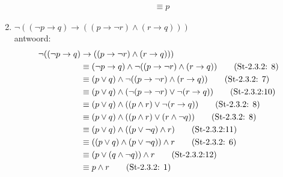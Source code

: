 \begin{answer}
\begin{enumerate}[label=\textit{\alph*.}]
\begin{align}
&\equiv p \tag{St-2.3.2: 1}
\end{align}
\item $\neg((\neg p\rightarrow q)\rightarrow ((p\rightarrow\neg r)\wedge(r\rightarrow q)))$\\
antwoord:
\begin{align}
\neg((\neg p\rightarrow q)&\rightarrow ((p\rightarrow\neg r)\wedge(r\rightarrow q)))\notag\\
&\equiv (\neg p\rightarrow q)\wedge\neg ((p\rightarrow\neg r)\wedge(r\rightarrow q))\tag{St-2.3.2: 8}\\
&\equiv (p\vee q)\wedge\neg((p\rightarrow\neg r)\wedge(r\rightarrow q))\tag{St-2.3.2: 7}\\
&\equiv (p\vee q)\wedge(\neg(p\rightarrow\neg r)\vee\neg(r\rightarrow q))\tag{St-2.3.2:10}\\
&\equiv (p\vee q)\wedge((p\wedge r)\vee\neg(r\rightarrow q))\tag{St-2.3.2: 8}\\
&\equiv (p\vee q)\wedge((p\wedge r)\vee(r\wedge\neg q))\tag{St-2.3.2: 8}\\
&\equiv (p\vee q)\wedge((p\vee\neg q)\wedge r)\tag{St-2.3.2:11}\\
&\equiv ((p\vee q)\wedge(p\vee\neg q))\wedge r\tag{St-2.3.2: 6}\\
&\equiv (p\vee(q\wedge\neg q))\wedge r\tag{St-2.3.2:12}\\
&\equiv p\wedge r\tag{St-2.3.2: 1}
\end{align}
\end{enumerate}
\end{answer}

